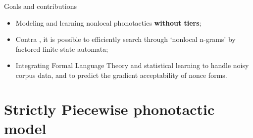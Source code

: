 \begin{frame}{Goals and contributions}

    \begin{itemize}
        \item Modeling and learning nonlocal phonotactics \textbf{without tiers};
        \item Contra \citet{gouskova2019inducing}, it is possible to efficiently search through `nonlocal n-grams' by factored finite-state automata;  
        \item Integrating Formal Language Theory and statistical learning to handle noisy corpus data, and to predict the gradient acceptability of nonce forms.
    \end{itemize}
\end{frame}

\section{Strictly Piecewise phonotactic model}



